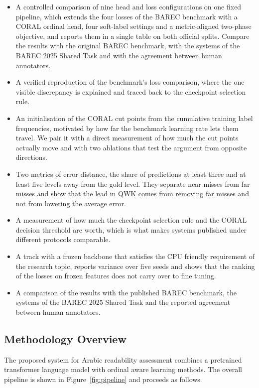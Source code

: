 \documentclass[12pt]{report}
\begin{document}
\begin{itemize}

\item A controlled comparison of nine head and loss configurations on one fixed pipeline, which extends the four losses of the BAREC benchmark with a CORAL ordinal head, four soft-label settings and a metric-aligned two-phase objective, and reports them in a single table on both official splits.
Compare the results with the original BAREC benchmark, with the systems of the BAREC 2025 Shared Task and with the agreement between human annotators.
\item A verified reproduction of the benchmark's loss comparison, where the one visible discrepancy is explained and traced back to the checkpoint selection rule.

\item An initialisation of the CORAL cut points from the cumulative training label frequencies, motivated by how far the benchmark learning rate lets them travel. We pair it with a direct measurement of how much the cut points actually move and with two ablations that test the argument from opposite directions.
\item Two metrics of error distance, the share of predictions at least three and at least five levels away from the gold level. They separate near misses from far misses and show that the lead in QWK comes from removing far misses and not from lowering the average error.

\item A measurement of how much the checkpoint selection rule and the CORAL decision threshold are worth, which is what makes systems published under different protocols comparable.

\item A track with a frozen backbone that satisfies the CPU friendly requirement of the research topic, reports variance over five seeds and shows that the ranking of the losses on frozen features does not carry over to fine tuning.

\item A comparison of the results with the published BAREC benchmark, the systems of the BAREC 2025 Shared Task and the reported agreement between human annotators.

\end{itemize}

\subsection{Methodology Overview}
The proposed system for Arabic readability assessment combines a pretrained transformer language model with ordinal aware learning methods. The overall pipeline is shown in Figure~\ref{fig:pipeline} and proceeds as follows.
\end{document}
